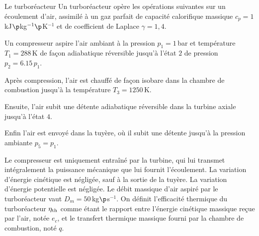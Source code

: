 \begin{exo}[PT][1][colle]{Le turboréacteur}%
Un turboréacteur opère les opérations suivantes sur un écoulement d’air, assimilé à un gaz parfait de capacité calorifique massique $c_p = 1\,$kJ$\p$kg$^{-1}\p$K$^{-1}$ et de coefficient de Laplace $\gamma=1,\!4$.
\begin{liste}
\item Un compresseur aspire l'air ambiant à la pression $p_1 = 1\,$bar et température $T_1 = 288\,$K de façon adiabatique réversible jusqu’à l’état $2$ de pression $p_2 = \num{6.15} \,p_1$.
\item Après compression, l'air est chauffé de façon isobare dans la chambre de combustion jusqu'à la température $T_3 = 1250\,$K.
\item Ensuite, l’air subit une détente adiabatique réversible dans la turbine axiale jusqu’à l’état $4$.
\item Enfin l'air est envoyé dans la tuyère, où il subit une détente jusqu’à la pression ambiante $p_5 = p_1$.
\end{liste}
Le compresseur est uniquement entraîné par la turbine, qui lui transmet intégralement la puissance mécanique que lui fournit l'écoulement.
La variation d’énergie cinétique est négligée, sauf à la sortie de la tuyère. La variation d’énergie potentielle est négligée.
Le débit massique d'air aspiré par le turboréacteur  vaut $D_m = 50\,$kg$\p$s$^{-1}$.
On définit l'efficacité thermique du turboréacteur $\eta_{\rm th}$ comme étant le rapport entre l'énergie cinétique massique reçue par l'air, notée $e_c$, et le transfert thermique massique fourni par la chambre de combustion, noté $q$.



\end{exo}
